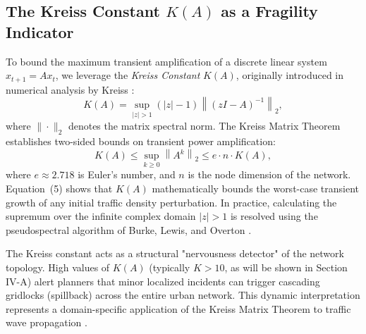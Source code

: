 \documentclass[lettersize,journal]{IEEEtran}
\begin{document}
\subsection{The Kreiss Constant $K(A)$ as a Fragility Indicator}
To bound the maximum transient amplification of a discrete linear system $x_{t+1} = A x_t$, we leverage the \emph{Kreiss Constant} $K(A)$, originally introduced in numerical analysis by Kreiss \cite{Kreiss1962}:
\begin{equation}
K(A) = \sup_{|z| > 1} (|z| - 1) \left\| (zI - A)^{-1} \right\|_2,
\end{equation}
where $\|\cdot\|_2$ denotes the matrix spectral norm. The Kreiss Matrix Theorem establishes two-sided bounds on transient power amplification:
\begin{equation}
K(A) \le \sup_{k \ge 0} \left\| A^k \right\|_2 \le e \cdot n \cdot K(A),
\end{equation}
where $e \approx 2.718$ is Euler's number, and $n$ is the node dimension of the network. Equation~(5) shows that $K(A)$ mathematically bounds the worst-case transient growth of any initial traffic density perturbation. In practice, calculating the supremum over the infinite complex domain $|z| > 1$ is resolved using the pseudospectral algorithm of Burke, Lewis, and Overton \cite{Burke2003}.

The Kreiss constant acts as a structural "nervousness detector" of the network topology. High values of $K(A)$ (typically $K > 10$, as will be shown in Section IV-A) alert planners that minor localized incidents can trigger cascading gridlocks (spillback) across the entire urban network. This dynamic interpretation represents a domain-specific application of the Kreiss Matrix Theorem to traffic wave propagation \cite{Trefethen2005}.
\end{document}
